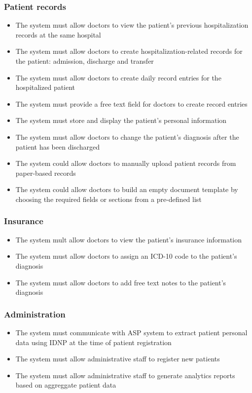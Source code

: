 \subsubsection{Patient records}
\begin{itemize}
    \item The system must allow doctors to view the patient's previous hospitalization records at the same hospital
    \item The system must allow doctors to create hospitalization-related records for the patient: admission, discharge and transfer
    \item The system must allow doctors to create daily record entries for the hospitalized patient
    \item The system must provide a free text field for doctors to create record entries
    \item The system must store and display the patient's personal information
    \item The system must allow doctors to change the patient's diagnosis after the patient has been discharged
    \item The system could allow doctors to manually upload patient records from paper-based records
    \item The system could allow doctors to build an empty document template by choosing the required fields or sections from a pre-defined list
\end{itemize}

\subsubsection{Insurance}
\begin{itemize}
    \item The system mult allow doctors to view the patient's insurance information
    \item The system must allow doctors to assign an ICD-10 code to the patient's diagnosis
    \item The system must allow doctors to add free text notes to the patient's diagnosis
\end{itemize}

\subsubsection{Administration}

\begin{itemize}
    \item The system must communicate with ASP system to extract patient personal data using IDNP at the time of patient registration
    \item The system must allow administrative staff to register new patients
    \item The system must allow administrative staff to generate analytics reports based on aggreggate patient data
\end{itemize}

